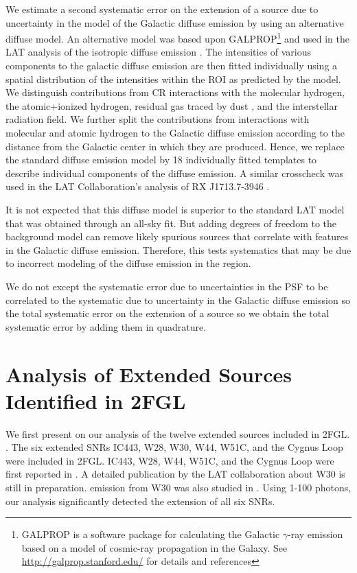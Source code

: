 \documentclass[12pt,preprint]{aastex}
\newcommand{\gev}{\text{GeV}\xspace}
\begin{document}

We estimate a second systematic error on the extension of a source
due to uncertainty in the model of the Galactic diffuse emission by
using an alternative diffuse model. An alternative model was based upon
GALPROP\footnote{GALPROP is a software package for calculating the
Galactic $\gamma$-ray emission based on a model of cosmic-ray propagation
in the Galaxy. See \url{http://galprop.stanford.edu/} for details and
references} and used in the LAT analysis of the isotropic diffuse
emission \citep{isotropic_lat}.  
The intensities of various components to the galactic
diffuse emission are then fitted individually using a spatial
distribution of the intensities within the ROI 
as predicted by the model.
We distinguish contributions from CR interactions with
the molecular hydrogen, the atomic+ionized hydrogen,
residual gas traced by dust \citep{isabelle_dark_gass},
and the interstellar radiation field. We further
split the contributions from interactions with molecular
and atomic hydrogen to the
Galactic diffuse emission according
to the distance from the Galactic center in
which they are produced. Hence, we replace
the standard diffuse emission model by 18
individually fitted templates to describe individual
components of the diffuse emission.
A similar crosscheck was used in the
LAT Collaboration's analysis of RX J1713.7-3946 \citep{rx_j1713_lat}.

It is not expected that this diffuse model is superior to the standard
LAT model that was obtained through an all-sky fit.  But adding degrees of freedom to the background model can
remove likely spurious sources that correlate with features in the
Galactic diffuse emission.  Therefore, this tests systematics that may
be due to incorrect modeling of the diffuse emission in the region.

We do not except the systematic error due to uncertainties in the PSF to
be correlated to the systematic due to uncertainty in the Galactic diffuse
emission so the total systematic error on the extension of a source so
we obtain the total systematic error by adding them in quadrature.

\section{Analysis of Extended Sources Identified in 2FGL}
\label{validate_known}


We first present on our analysis of the twelve extended sources
included in 2FGL.
\citep{second_cat}.
The six extended SNRs IC443, W28, W30, W44, W51C, and the
Cygnus Loop were included in 2FGL.  IC443, W28, W44, W51C, and the
Cygnus Loop were
first reported in \cite{ic443,w28,w44,w51c,cygnus_loop_lat}.  A
detailed publication by the LAT
collaboration about W30 is still in preparation.
\gev emission from W30 was also studied in \cite{castro_and_slane_2010}.
Using 1-100 \gev photons, our analysis significantly detected the
extension of all six SNRs.
\end{document}
